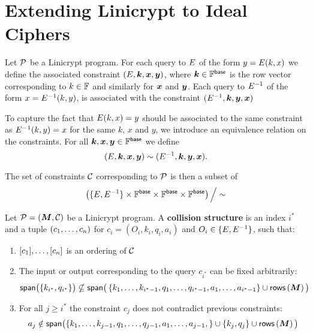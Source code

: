 \chapter{Extending Linicrypt to Ideal Ciphers}

Let $\P$ be a Linicrypt program.
For each query to $\E$ of the form $y = \E(k,x)$ we define the associated constraint
$(\E, \v k, \v x, \v y)$, where $\v k \in \F^\base$ is the row vector corresponding
to $k \in \F$ and similarly for $\v x$ and $\v y$.
Each query to $\D$ of the form $x = \D(k, y)$, is associated with the
constraint $(\D, \v k, \v y, \v x)$

To capture the fact that $\E(k, x) = y$ should be associated to the same
constraint as $\D(k,y) = x$ for the same $k$, $x$ and $y$,
we introduce an equivalence relation on the constraints. 
For all $\v k, \v x, \v y \in \Base$ we define
\[
    (\E, \v k,\v x, \v y) \sim (\D, \v k, \v y, \v x).
\]

The set of constraints $\C$ corresponding to $\P$ is then a subset of
\[
    \left( \{\E, \D\} \times \Base \times \Base \times \Base \right) \Big/\sim
\]


\begin{defn}
    Let $\P = (\M, \C)$ be a Linicrypt program.
    A \textbf{collision structure} is an index $i^*$ and a tuple
    $(\c_1, \dots, \c_n)$ for $c_i = (O_i, k_i, q_i, a_i)$ and
    $O_i \in \{\E, \D\}$, such that:
    \begin{enumerate}
        \item $[\c_1], \dots, [\c_n]$ is an ordering of $\C$
        \item The input or output corresponding to the query $c_{i^*}$ can be fixed arbitrarily:
        \[
            \span\big(\{ k_{i^*}, q_{i^*} \}\big) \nsubseteq
            \span\big( 
            \left\{
            k_1, \dots, k_{i^* -1},
            q_1, \dots, q_{i^* -1},
            a_1, \dots, a_{i^* -1}
            \right\}
            \cup \rows\left(\M\right)
            \big)
        \]
        \item For all $j \geq i^*$ the constraint $c_j$ does not contradict previous constraints: 
        \[
            a_j \notin \span\big( \{
            k_1, \dots, k_{j -1},
            q_1, \dots, q_{j -1},
            a_1, \dots, a_{j -1},
            \} 
            \cup \{ k_j, q_j\}
            \cup \rows\left(\M\right)
            \big)
        \]
    \end{enumerate}
\end{defn}
